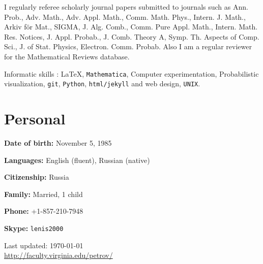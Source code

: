 \documentclass[letterpaper,11pt]{article}
\def\footerlink{http://faculty.virginia.edu/petrov/}
\begin{document}

\medskip


I regularly referee scholarly journal papers
submitted to journals such as 
Ann. Prob., 
Adv. Math., 
Adv. Appl. Math., 
Comm. Math. Phys.,
Intern. J. Math.,
Arkiv f\"or Mat.,
SIGMA,
J. Alg. Comb.,
Comm. Pure Appl. Math.,
Intern. Math. Res. Notices,
J. Appl. Probab.,
J. Comb. Theory A,
Symp. Th. Aspects of Comp. Sci.,
J. of Stat. Physics,
Electron. Comm. Probab.
Also I am a regular reviewer for the
Mathematical Reviews database.






\medskip

Informatic skills : 
\LaTeX, 
\texttt{Mathematica}, 
Computer experimentation,
Probabilistic visualization,
\texttt{git},
\texttt{Python}, 
\texttt{html/jekyll} and web design, \texttt{UNIX}.

\section*{Personal}

\textbf{Date of birth:} November 5, 1985

\textbf{Languages:} English (fluent), Russian (native)

\textbf{Citizenship:} Russia

\textbf{Family:} Married, 1 child

\textbf{Phone:} +1-857-210-7948

\textbf{Skype:} \texttt{lenis2000}


\bigskip

\begin{center}
  \begin{footnotesize}
    Last updated: \today \\
    \href{\footerlink}{\url{\footerlink}}
  \end{footnotesize}
\end{center}
 
\end{document}
